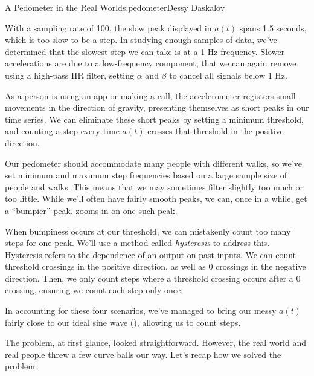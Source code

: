 \begin{aosachapter}{A Pedometer in the Real World}{s:pedometer}{Dessy Daskalov}
\label{slow-peaks}

With a sampling rate of 100, the slow peak displayed in $a(t)$ spans 1.5
seconds, which is too slow to be a step. In studying enough samples of
data, we've determined that the slowest step we can take is at a 1 Hz
frequency. Slower accelerations are due to a low-frequency component,
that we can again remove using a high-pass IIR filter, setting $\alpha$
and $\beta$ to cancel all signals below 1 Hz.

\label{short-peaks}

As a person is using an app or making a call, the accelerometer
registers small movements in the direction of gravity, presenting
themselves as short peaks in our time series. We can eliminate these
short peaks by setting a minimum threshold, and counting a step every
time $a(t)$ crosses that threshold in the positive direction.

\label{bumpy-peaks}

Our pedometer should accommodate many people with different walks, so
we've set minimum and maximum step frequencies based on a large sample
size of people and walks. This means that we may sometimes filter
slightly too much or too little. While we'll often have fairly smooth
peaks, we can, once in a while, get a ``bumpier'' peak.
 zooms in on one such peak.

When bumpiness occurs at our threshold, we can mistakenly count too many
steps for one peak. We'll use a method called \emph{hysteresis} to
address this. Hysteresis refers to the dependence of an output on past
inputs. We can count threshold crossings in the positive direction, as
well as 0 crossings in the negative direction. Then, we only count steps
where a threshold crossing occurs after a 0 crossing, ensuring we count
each step only once.

\label{peaks-that-are-juuuust-right}


In accounting for these four scenarios, we've managed to bring our messy
$a(t)$ fairly close to our ideal sine wave
(), allowing us to count
steps.

\label{recap}

The problem, at first glance, looked straightforward. However, the real
world and real people threw a few curve balls our way. Let's recap how
we solved the problem:


\end{aosachapter}
